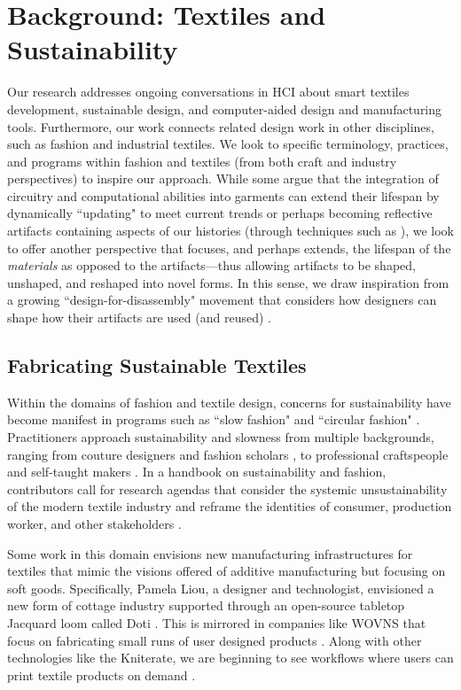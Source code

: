 \section{Background: Textiles and Sustainability}
Our research addresses ongoing conversations in HCI about smart textiles development, sustainable design, and computer-aided design and manufacturing tools. Furthermore, our work connects related design work in other disciplines, such as fashion and industrial textiles. We look to specific terminology, practices, and programs within fashion and textiles (from both craft and industry perspectives) to inspire our approach.  While some argue that the integration of circuitry and computational abilities into garments can extend their lifespan by dynamically ``updating" to meet current trends  \cite{ivan_keynote} or perhaps becoming reflective artifacts containing aspects of our histories (through techniques such as \cite{rosner_spyn:_2008}), we look to offer another perspective that focuses, and perhaps extends, the lifespan of the \textit{materials} as opposed to the artifacts---thus allowing artifacts to be shaped, unshaped, and reshaped into novel forms. In this sense, we draw inspiration from a growing ``design-for-disassembly" movement that considers how designers can shape how their artifacts are used (and reused) \cite{webster_dfd, circular_disassembly}.

\subsection{Fabricating Sustainable Textiles}
Within the domains of fashion and textile design, concerns for sustainability have become manifest in programs such as ``slow fashion" \cite{phelan_what_2017} and ``circular fashion" \cite{circular_fashion}. Practitioners approach sustainability and slowness from multiple backgrounds, ranging from couture designers \cite{piper_crafting_2015} and fashion scholars \cite{fletcher_sustainability_2014, fletcher_craft_2016}, to professional craftspeople \cite{essen_easysupp_2016, unravellingclub} and self-taught makers \cite{ravelry_thriftyknitters}. In a handbook on sustainability and fashion, contributors call for research agendas that consider the systemic unsustainability of the modern textile industry and reframe the identities of consumer, production worker, and other stakeholders \cite{fletcher_sustainability_2014}.

Some work in this domain envisions new manufacturing infrastructures for textiles that mimic the visions offered of additive manufacturing but focusing on soft goods. Specifically, Pamela Liou, a designer and technologist, envisioned a new form of cottage industry supported through an open-source tabletop Jacquard loom called Doti \cite{liou_doti:_2015}. This is mirrored in companies like WOVNS that focus on fabricating small runs of user designed products \cite{wovns}. Along with other technologies like the Kniterate, we are beginning to see workflows where users can print textile products on demand \cite{kniterate}. 

